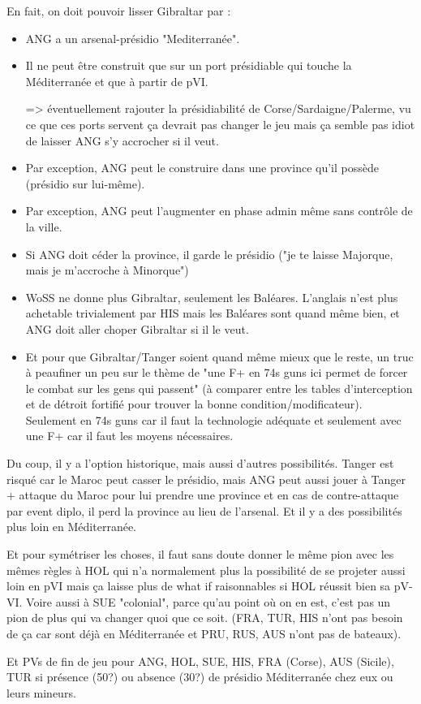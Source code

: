 \begin{todo}
  En fait, on doit pouvoir lisser Gibraltar par :
  \begin{itemize}
  \item  ANG a un arsenal-présidio "Mediterranée".
  \item  Il ne peut être construit que sur un port présidiable qui
    touche la Méditerranée et que à partir de pVI.

    => éventuellement rajouter la présidiabilité de
    Corse/Sardaigne/Palerme, vu ce que ces ports servent ça devrait pas
    changer le jeu mais ça semble pas idiot de laisser ANG s'y accrocher
    si il veut.
  \item Par exception, ANG peut le construire dans une province qu'il
    possède (présidio sur lui-même).
  \item  Par exception, ANG peut l'augmenter en phase admin même sans
    contrôle de la ville.
  \item Si ANG doit céder la province, il garde le présidio ("je te
    laisse Majorque, mais je m'accroche à Minorque")
  \item WoSS ne donne plus Gibraltar, seulement les Baléares. L'anglais
    n'est plus achetable trivialement par HIS mais les Baléares sont
    quand même bien, et ANG doit aller choper Gibraltar si il le veut.
  \item Et pour que Gibraltar/Tanger soient quand même mieux que le
    reste, un truc à peaufiner un peu sur le thème de "une F+ en 74s
    guns ici permet de forcer le combat sur les gens qui passent" (à
    comparer entre les tables d'interception et de détroit fortifié pour
    trouver la bonne condition/modificateur). Seulement en 74s guns car
    il faut la technologie adéquate et seulement avec une F+ car il faut
    les moyens nécessaires.
  \end{itemize}

  Du coup, il y a l'option historique, mais aussi d'autres
  possibilités. Tanger est risqué car le Maroc peut casser le présidio,
  mais ANG peut aussi jouer à Tanger + attaque du Maroc pour lui prendre
  une province et en cas de contre-attaque par event diplo, il perd la
  province au lieu de l'arsenal. Et il y a des possibilités plus loin en
  Méditerranée.

  Et pour symétriser les choses, il faut sans doute donner le même pion
  avec les mêmes règles à HOL qui n'a normalement plus la possibilité de
  se projeter aussi loin en pVI mais ça laisse plus de what if
  raisonnables si HOL réussit bien sa pV-VI. Voire aussi à SUE
  "colonial", parce qu'au point où on en est, c'est pas un pion de plus
  qui va changer quoi que ce soit. (FRA, TUR, HIS n'ont pas besoin de ça
  car sont déjà en Méditerranée et PRU, RUS, AUS n'ont pas de bateaux).

  Et PVs de fin de jeu pour ANG, HOL, SUE, HIS, FRA (Corse), AUS
  (Sicile), TUR si présence (50?) ou absence (30?) de présidio
  Méditerranée chez eux ou leurs mineurs.
\end{todo}

